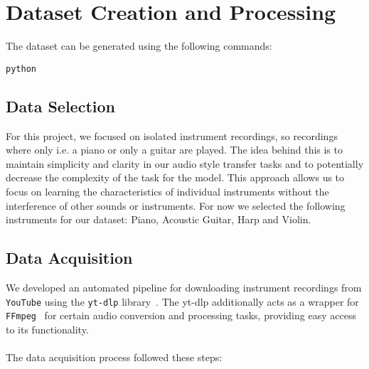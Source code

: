 \section{Dataset Creation and Processing}

The dataset can be generated using the following commands:

\begin{lstlisting}[caption={Generating the dataset}]
python 
\end{lstlisting}

\subsection{Data Selection}
For this project, we focused on isolated instrument recordings, so recordings where only i.e. a piano or only a guitar are played.
The idea behind this is to maintain simplicity and clarity in our audio style transfer tasks and to potentially decrease the complexity of the task for the model.
This approach allows us to focus on learning the characteristics of individual instruments without the interference of other sounds or instruments.
For now we selected the following instruments for our dataset: Piano, Acoustic Guitar, Harp and Violin.


\subsection{Data Acquisition}
\label{sec:data_acquisition}
We developed an automated pipeline for downloading instrument recordings from \texttt{YouTube} using the \texttt{yt-dlp} library~\cite{youtube,yt-dlp}.
The yt-dlp additionally acts as a wrapper for \texttt{FFmpeg}~\cite{ffmpeg} for certain audio conversion and processing tasks, providing easy access to its functionality.
\\\\
The data acquisition process followed these steps:

